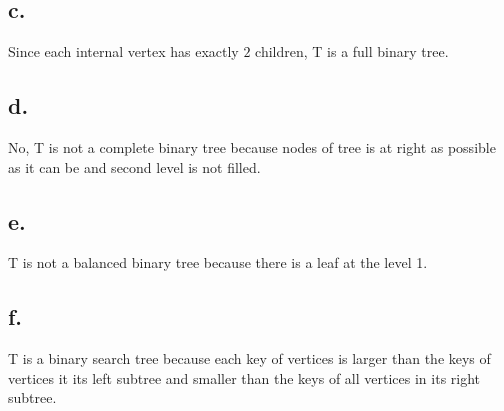 \documentclass[12pt]{article}
\begin{document}
\subsection*{c.}
Since each internal vertex has exactly $2$ children, T is a full binary tree.
\subsection*{d.}
No, T is not a complete binary tree because nodes of tree is at right as possible as it can be and second level is not filled.
\subsection*{e.}
T is not a balanced binary tree because there is a leaf at the level 1. 
\subsection*{f.}
T is a binary search tree because each key of vertices is larger than the keys of vertices it its left subtree and smaller than the keys of all vertices in its right subtree.
\end{document}
